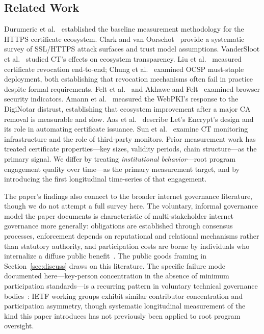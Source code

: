 \documentclass[10pt,twocolumn,letterpaper]{article}
\begin{document}
\subsection{Related Work}
Durumeric et al.~\cite{durumeric2013} established the baseline measurement
methodology for the HTTPS certificate ecosystem. Clark and van
Oorschot~\cite{clark2013} provide a systematic survey of SSL/HTTPS attack
surfaces and trust model assumptions. VanderSloot et
al.~\cite{vandersloot2017} studied CT's effects on ecosystem transparency.
Liu et al.~\cite{liu2015} measured certificate revocation end-to-end;
Chung et al.~\cite{chung2017} examined OCSP must-staple deployment, both
establishing that revocation mechanisms often fail in practice despite
formal requirements. Felt et al.~\cite{felt2017} and Akhawe and
Felt~\cite{akhawe2013} examined browser security indicators. Amann et
al.~\cite{amann2017} measured the WebPKI's response to the DigiNotar
distrust, establishing that ecosystem improvement after a major CA removal
is measurable and slow. Aas et al.~\cite{aas2019} describe Let's
Encrypt's design and its role in automating certificate issuance. Sun et
al.~\cite{sun2024} examine CT monitoring infrastructure and the role of
third-party monitors. Prior measurement work has treated certificate
properties---key sizes, validity periods, chain structure---as the primary
signal. We differ by treating \textit{institutional behavior}---root program
engagement quality over time---as the primary measurement target, and by
introducing the first longitudinal time-series of that engagement.

The paper's findings also connect to the broader internet governance
literature, though we do not attempt a full survey here. The voluntary,
informal governance model the paper documents is characteristic of
multi-stakeholder internet governance more generally: obligations are
established through consensus processes, enforcement depends on
reputational and relational mechanisms rather than statutory authority,
and participation costs are borne by individuals who internalize a
diffuse public benefit~\cite{mueller2010}. The public goods
framing in Section~\ref{sec:discuss} draws on this literature.
The specific failure mode documented here---key-person concentration
in the absence of minimum participation standards---is a recurring
pattern in voluntary technical governance bodies~\cite{simcoe2012}:
IETF working groups exhibit similar contributor concentration and
participation asymmetry, though systematic longitudinal measurement
of the kind this paper introduces has not previously been applied to
root program oversight.
\end{document}
